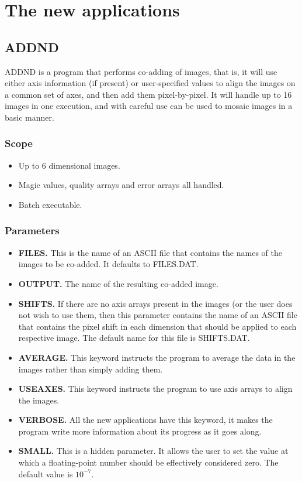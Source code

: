\section{The new applications}
\label{sec:new-app}

\subsection{ADDND}

ADDND is a program that performs co-adding of images, that is, it will use
either axis information (if present) or user-specified values to align the
images on a common set of axes, and then add them pixel-by-pixel. It will
handle up to 16 images in one execution, and with careful use can be used to
mosaic images in a basic manner. 

\subsubsection{Scope}

\begin{itemize}
\item Up to 6 dimensional images.
\item Magic values, quality arrays and error arrays all handled.
\item Batch executable.
\end{itemize}

\subsubsection{Parameters}

\begin{itemize}
\item {\bf FILES.} This is the name of an ASCII file that contains the names of
the images to be co-added. It defaults to FILES.DAT.
\item {\bf OUTPUT.} The name of the resulting co-added image.
\item {\bf SHIFTS.} If there are no axis arrays present in the images (or the
user does not wish to use them, then this parameter contains the name of an
ASCII file that contains the pixel shift in each dimension that should be
applied to each respective image. The default name for this file is SHIFTS.DAT.
\item {\bf AVERAGE.} This keyword instructs the program to average the data in
the images rather than simply adding them.
\item {\bf USEAXES.} This keyword instructs the program to use axis arrays to
align the images.
\item {\bf VERBOSE.} All the new applications have this keyword, it makes the
program write more information about its progress as it goes along.
\item {\bf SMALL.} This is a hidden parameter. It allows the user to set the
value at which a floating-point number should be effectively considered zero.
The default value is $10^{-7}$.
\end{itemize}

